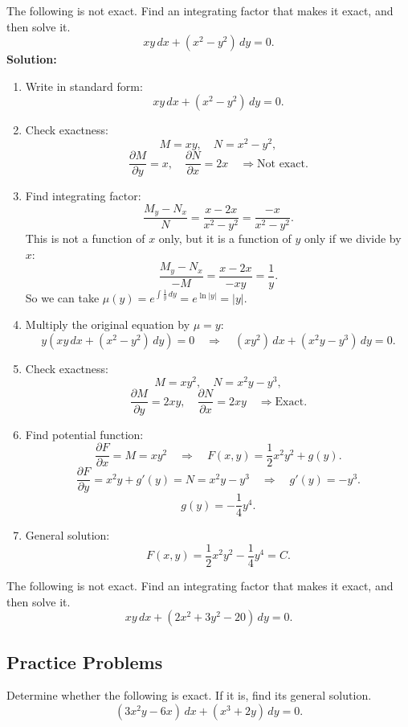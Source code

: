 \begin{example}
  The following \ode{} is not exact. Find an integrating factor that makes it exact, and then solve it.
  \[xy\,dx + (x^{2} - y^{2})\,dy = 0.\]
  \textbf{Solution:}
  \begin{enumerate}
      \item Write in standard form:
      \[xy\,dx + (x^{2} - y^{2})\,dy = 0.\]
      \item Check exactness:
      \[M = xy, \quad N = x^{2} - y^{2},\]
      \[\frac{\partial M}{\partial y} = x, \quad \frac{\partial N}{\partial x} = 2x \quad \Rightarrow \text{Not exact.}\]
      \item Find integrating factor:
      \[\frac{M_y - N_x}{N} = \frac{x - 2x}{x^{2} - y^{2}} = \frac{-x}{x^{2} - y^{2}}.\]
      This is not a function of \(x\) only, but it is a function of \(y\) only if we divide by \(x\):
      \[\frac{M_y - N_x}{-M} = \frac{x - 2x}{-xy} = \frac{1}{y}.\]
      So we can take \(\mu(y) = e^{\int \frac{1}{y} \, dy} = e^{\ln|y|} = |y|\).
      \item Multiply the original equation by \(\mu  = y\):
      \[y(xy\,dx + (x^{2} - y^{2})\,dy) = 0 \quad \Rightarrow \quad (x y^{2})\,dx + (x^{2}y - y^{3})\,dy = 0.\]
      \item Check exactness:
      \[M = x y^{2}, \quad N = x^{2}y - y^{3},\]
      \[\frac{\partial M}{\partial y} = 2xy, \quad \frac{\partial N}{\partial x} = 2xy \quad \Rightarrow \text{Exact.}\]
      \item Find potential function:
      \[\frac{\partial F}{\partial x} = M = x y^{2} \quad \Rightarrow \quad F(x,y) = \frac{1}{2}x^{2}y^{2} + g(y).\]
      \[\frac{\partial F}{\partial y} = x^{2}y + g'(y) = N = x^{2}y - y^{3} \quad \Rightarrow \quad g'(y) = -y^{3}.\]
      \[g(y) = -\frac{1}{4}y^{4}.\]
      \item General solution:
      \[F(x,y) = \frac{1}{2}x^{2}y^{2} - \frac{1}{4}y^{4} = C.\]
  \end{enumerate}
\end{example}


\begin{question}
  The following \ode{} is not exact. Find an integrating factor that makes it exact, and then solve it.
  \[ xy\,dx + (2x^2 + 3y^2 - 20)\,dy = 0.\]
\end{question}



\subsection*{Practice Problems}
\begin{question}
  Determine whether the following \ode{} is exact. If it is, find its general solution.
  \[
    (3x^{2}y - 6x)\,dx + (x^{3} + 2y)\,dy = 0.
  \]
\end{question}


